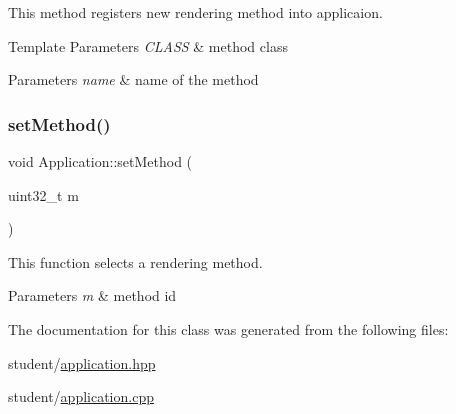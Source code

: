 This method registers new rendering method into applicaion. 


\begin{DoxyTemplParams}{Template Parameters}
{\em C\+L\+A\+SS} & method class \\
\hline
\end{DoxyTemplParams}

\begin{DoxyParams}{Parameters}
{\em name} & name of the method \\
\hline
\end{DoxyParams}
\mbox{\label{classApplication_a5c018483318ffd6b3121902980e0e122}} 
\subsubsection{\texorpdfstring{set\+Method()}{setMethod()}}
{\footnotesize\ttfamily void Application\+::set\+Method (\begin{DoxyParamCaption}\item[{uint32\+\_\+t}]{m }\end{DoxyParamCaption})}



This function selects a rendering method. 


\begin{DoxyParams}{Parameters}
{\em m} & method id \\
\hline
\end{DoxyParams}


The documentation for this class was generated from the following files\+:\begin{DoxyCompactItemize}
\item 
student/\hyperlink{application_8hpp}{application.\+hpp}\item 
student/\hyperlink{application_8cpp}{application.\+cpp}\end{DoxyCompactItemize}
